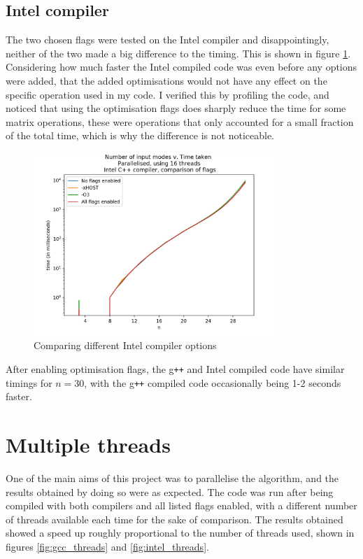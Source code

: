 \documentclass[ %
                    author={Manan Vaswani},
                supervisor={Dr. Raphael Clifford},
                    degree={MEng},
                     title={A multi-core CPU implementation of the classical Boson Sampling algorithm},
                  subtitle={},
                      type={},
                      year={2019} ]{dissertation}
\theoremstyle{plain}
\theoremstyle{definition}
\begin{document}
\subsection{Intel compiler}
The two chosen flags were tested on the Intel compiler and disappointingly, neither of the two made a big difference to the timing. This is shown in figure \ref{fig:intel_flags}. Considering how much faster the Intel compiled code was even before any options were added, that the added optimisations would not have any effect on the specific operation used in my code. I verified this by profiling the code, and noticed that using the optimisation flags does sharply reduce the time for some matrix operations, these were operations that only accounted for a small fraction of the total time, which is why the difference is not noticeable.
\begin{figure}
	\centering
  \includegraphics[width=25em]{Graphs/intel_flags_log.png}
  \caption{Comparing different Intel compiler options}
  \label{fig:intel_flags}
\end{figure}

After enabling optimisation flags, the g\texttt{++} and Intel compiled code have similar timings for $n=30$, with the g\texttt{++} compiled code occasionally being 1-2 seconds faster.

\section{Multiple threads}
One of the main aims of this project was to parallelise the algorithm, and the results obtained by doing so were as expected. The code was run after being compiled with both compilers and all listed flags enabled, with a different number of threads available each time for the sake of comparison. The results obtained showed a speed up roughly proportional to the number of threads used, shown in figures \ref{fig:gcc_threads} and \ref{fig:intel_threads}. 
\end{document}
